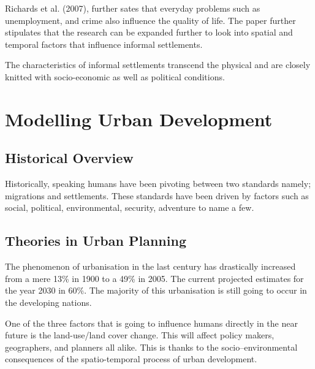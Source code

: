 Richards et al. (2007), further sates that everyday problems such as unemployment, and crime also influence the quality of life. The paper further stipulates that the research can be expanded further to look into spatial and temporal factors that influence informal settlements.

The characteristics of informal settlements transcend the physical and are closely knitted with socio-economic as well as political conditions\citep{wekesa}.
\section{Modelling Urban Development}
\subsection{Historical Overview}
Historically, speaking humans have been pivoting between two standards namely; migrations and settlements. These standards have been driven by factors such as social, political, environmental, security, adventure to name a few\cite{mum}.

\subsection{Theories in Urban Planning}

The phenomenon of urbanisation in the last century has drastically increased from a mere 13\% in 1900 to a 49\% in 2005. The current projected estimates for the year 2030 in 60\%. The majority of this urbanisation is still going to occur in the developing nations\citep{un2005}.

One of the three factors that is going to influence humans directly in the near future is the land-use/land cover change. This will affect policy makers, geographers, and planners all alike. This is thanks to the socio–environmental consequences of the spatio-temporal process of urban development\citep{vitousek1994beyond,liu2008modelling}.

